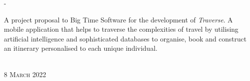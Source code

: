 \begin{titlingpage}
\begin{SingleSpace}
\begin{adjustwidth*}{\unitlength}{-\unitlength}
\begin{center}
\vspace{11mm}
\begin{minipage}{13cm}
	\center A project proposal to Big Time Software for the development of \textit{Traverse}. A mobile application that helps to traverse the complexities of travel by utilising artificial intelligence and sophisticated databases to organise, book and construct an itinerary personalised to each unique individual.
\end{minipage}\\
\vspace{9mm}
{\large\textsc{8 March 2022}}
\vspace{12mm}
\end{center}
\begin{flushright}
\end{flushright}
\end{adjustwidth*}
\end{SingleSpace}
\end{titlingpage}
